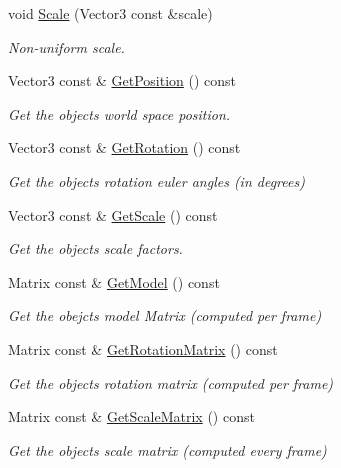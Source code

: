 \begin{DoxyCompactItemize}
void \hyperlink{classTransformComponent_ad7f67d4a0962e928cd7df730002d4dc8}{Scale} (Vector3 const \&scale)
\begin{DoxyCompactList}\small\item\em Non-\/uniform scale. \end{DoxyCompactList}\item 
Vector3 const  \& \hyperlink{classTransformComponent_a31ce3a262b59b97eadd0187319ed812d}{Get\+Position} () const
\begin{DoxyCompactList}\small\item\em Get the object\textquotesingle{}s world space position. \end{DoxyCompactList}\item 
Vector3 const  \& \hyperlink{classTransformComponent_a66072d2fe63c96e8cded35fca0579400}{Get\+Rotation} () const
\begin{DoxyCompactList}\small\item\em Get the object\textquotesingle{}s rotation euler angles (in degrees) \end{DoxyCompactList}\item 
Vector3 const  \& \hyperlink{classTransformComponent_af9a3c385a334fadeac09a18149e89d05}{Get\+Scale} () const
\begin{DoxyCompactList}\small\item\em Get the object\textquotesingle{}s scale factors. \end{DoxyCompactList}\item 
Matrix const  \& \hyperlink{classTransformComponent_a558145da72066c99bec2a4a8ec3e2fa1}{Get\+Model} () const
\begin{DoxyCompactList}\small\item\em Get the obejct\textquotesingle{}s model Matrix (computed per frame) \end{DoxyCompactList}\item 
Matrix const  \& \hyperlink{classTransformComponent_a95adaed6de8c45ab76479fe990dbb5cc}{Get\+Rotation\+Matrix} () const
\begin{DoxyCompactList}\small\item\em Get the object\textquotesingle{}s rotation matrix (computed per frame) \end{DoxyCompactList}\item 
Matrix const  \& \hyperlink{classTransformComponent_af55f4a1e6167f8a260e581850848299d}{Get\+Scale\+Matrix} () const
\begin{DoxyCompactList}\small\item\em Get the object\textquotesingle{}s scale matrix (computed every frame) \end{DoxyCompactList}\item 

\end{DoxyCompactItemize}
